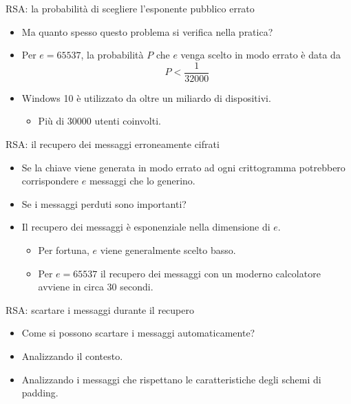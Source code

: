 \documentclass[11pt,svgnames,smaller,aspectratio=169,italian]{beamer}
\begin{document}
\begin{frame}{RSA: la probabilità di scegliere l'esponente pubblico errato}
	\begin{itemize}
		\item Ma quanto spesso questo problema si verifica nella pratica?
		\item Per $e = 65537$, la probabilità $P$ che $e$ venga scelto in modo errato è data da
			\begin{equation*}
				P < \frac{1}{32000}
			\end{equation*}
		\item Windows 10 è utilizzato da oltre un miliardo di dispositivi.
			\begin{itemize}
				\item Più di 30000 utenti coinvolti.
			\end{itemize}
	\end{itemize}
\end{frame}

\begin{frame}{RSA: il recupero dei messaggi erroneamente cifrati}
	\begin{itemize}
		\item Se la chiave viene generata in modo errato ad ogni crittogramma potrebbero corrispondere $e$ messaggi che lo generino.
		\item Se i messaggi perduti sono importanti?
		\item Il recupero dei messaggi è esponenziale nella dimensione di $e$.
			\begin{itemize}
				\item Per fortuna, $e$ viene generalmente scelto basso.
				\item Per $e = 65537$ il recupero dei messaggi con un moderno calcolatore avviene in circa 30 secondi.
			\end{itemize}
	\end{itemize}
\end{frame}

\begin{frame}{RSA: scartare i messaggi durante il recupero}
	\begin{itemize}
		\item Come si possono scartare i messaggi automaticamente?
		\item Analizzando il contesto.
		\item Analizzando i messaggi che rispettano le caratteristiche degli schemi di padding.
	\end{itemize}
\end{frame}
\end{document}
